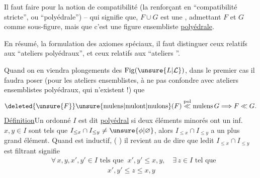 Il faut faire     pour la notion de compatibilité (la renforçant en ``compatibilité stricte'', ou ``polyédrale'') -- qui signifie que,  $F\cup G$ est une  , admettant $F$ et $G$ comme sous-figure, mais que c'est une figure ensembliste \uline{polyédrale}.

En résumé,  la formulation des axiomes spéciaux, il faut distinguer ceux relatifs aux ``ateliers polyédraux'', et ceux relatifs aux ``ateliers ''.

Quand on en viendra  plongements des $\mathrm{Fig}(\unsure{L|\mathcal{L}})$, dans le premier cas il faudra poser (pour les ateliers  ensemblistes, à ne pas confondre avec ateliers ensemblistes polyédraux, qui n'existent  !)
que
\[
\deleted{\unsure{F}}\unsure{\mathrm{mulens}|\mathrm{mulont}|\mathrm{mulons}}(F)
\overset{\mathrm{pol}}{\ll}\mathrm{mulens}\,G\Longrightarrow F\ll G.
\]
\uline{Définition}\quad Un  ordonné $I$ est dit \uline{polyédral} si deux éléments minorés ont un inf.   
$x,y\in I$ sont tels que $I_{\leq x}\cap I_{\leq y}\neq\unsure{\phi|\varnothing}$, alors $I_{\leq x}\cap I_{\leq y}$ a un plus grand élément. Quand  est inductif, ( )  il revient au  de dire que ledit  $I_{\leq x}\cap I_{\leq y}$ est filtrant\unsure{,)}  signifie
\[
\begin{aligned}
&\forall\,x,y,x',y'\in I\text{ tels que }\ x',y'\leq x,y,\quad \exists\,z\in I\text{ tel que}\\
&\hspace{8em}x',y'\leq z\leq x,y
\end{aligned}
\]

